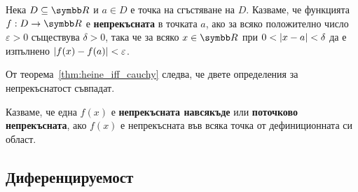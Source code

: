 \documentclass[numbers=endperiod, bibliography=totocnumbered]{scrartcl}
\begin{document}
\begin{definition}
  Нека \( D \subseteq \R \) и \( a \in D \) е точка на сгъстяване на \( D \). Казваме, че функцията \( f: D \to \R \) е \textbf{непрекъсната} в точката \( a \), ако за всяко положително число \( \varepsilon > 0 \) съществува \( \delta > 0 \), така че за всяко \( x \in \R \) при \( 0 < \left\vert x - a \right\vert < \delta \) да е изпълнено \( \left\vert f(x) - f(a) \right\vert < \varepsilon \).
\end{definition}

\begin{remark}
  От теорема~\ref{thm:heine_iff_cauchy} следва, че двете определения за непрекъснатост съвпадат.
\end{remark}

\begin{definition}
  Казваме, че една \( f(x) \) е \textbf{непрекъсната навсякъде} или \textbf{поточково непрекъсната}, ако \( f(x) \) е непрекъсната във всяка точка от дефиниционната си област.
\end{definition}

\subsection{Диференцируемост}
\end{document}
